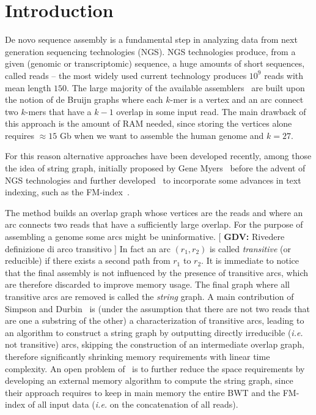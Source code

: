 \documentclass[runningheads,envcountsame,a4paper]{llncs}
\newcommand{\notaestesa}[2]{%
 \marginpar{\color{red!75!black}\textbf{\texttimes}}%
 {\color{red!75!black}%
 [\,\textbullet\,\textsf{\textbf{#1:}} %
 \textsf{\footnotesize#2}\,\textbullet\,]}%
}
\newcommand{\ie}{\textit{i.e.}\xspace}
\begin{document}
\section{Introduction}
De novo sequence assembly is a fundamental step
in analyzing data from next generation sequencing technologies (NGS).
NGS technologies produce, from a given (genomic or transcriptomic) sequence, a huge amounts
of short sequences, called reads -- the most widely used current technology
produces $10^{9}$ reads with mean length $150$.
The large majority of the available
assemblers~\cite{Zerbino2008,Simpson2009,Peng2010,bankevich2012spades} are built
upon the notion of de Bruijn graphs where each $k$-mer is a vertex and an arc
connect two $k$-mers that have a $k-1$ overlap in some input read.
The main drawback of this approach is the amount of RAM needed, since storing
the vertices alone requires $\approx 15$ Gb when we want to assemble the human genome
and $k=27$.

For this reason alternative approaches have been developed recently, among those
the idea of string graph, initially proposed by Gene Myers~\cite{Myers2005}
before the advent of NGS technologies and further
developed~\cite{Simpson2010,Simpson2012} to incorporate some advances in text
indexing, such as the FM-index~\cite{Ferragina2005}.

The method builds an overlap graph whose vertices are the reads and where an arc
connects two reads that have a sufficiently large overlap.
For the purpose of assembling a genome some arcs might be uninformative.
\notaestesa{GDV}{Rivedere definizione di arco transitivo} In fact an arc $(r_{1}, r_{2})$ is called \emph{transitive} (or reducible) if there exists a
second path from $r_{1}$ to $r_{2}$.
It is immediate to notice that the final assembly is not influenced by the
presence of transitive arcs, which are therefore discarded to improve memory usage.
The final graph where all transitive arcs are removed is called the \emph{string} graph.
A main contribution of
Simpson and Durbin~\cite{Simpson2010} is (under the assumption
that there are not two reads that are one a substring of the other) a
characterization of transitive arcs, leading to an algorithm to construct a string
graph by outputting directly irreducible (\ie not transitive) arcs, skipping the
construction of an intermediate overlap graph, therefore significantly shrinking
memory requirements with linear time complexity.
An open problem of~\cite{Simpson2010} is to further reduce
the space requirements by developing an external memory algorithm to compute the
string graph, since their approach requires to keep in main memory the entire
BWT and the FM-index of all input data (\ie on the concatenation of all reads).
\end{document}
